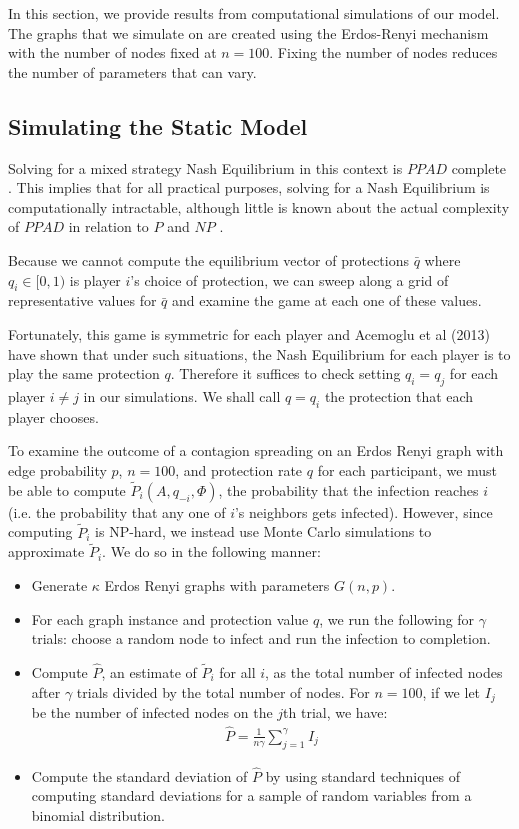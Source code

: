 \documentclass{article}
\theoremstyle{plain}
\begin{document}
In this section, we provide results from computational simulations of our model. The graphs that we simulate on are created using the Erdos-Renyi mechanism with the number of nodes fixed at $n = 100$. Fixing the number of nodes reduces the number of parameters that can vary.

\subsection{Simulating the Static Model}

Solving for a mixed strategy Nash Equilibrium in this context is $PPAD$ complete \cite{daskalakis08}. This implies that for all practical purposes, solving for a Nash Equilibrium is computationally intractable, although little is known about the actual complexity of $PPAD$ in relation to $P$ and $NP$ \cite{chen06}.

Because we cannot compute the equilibrium vector of protections $\bar{q}$ where $q_i \in [0,1)$ is player $i$'s choice of protection, we can sweep along a grid of representative values for $\bar{q}$ and examine the game at each one of these values.

Fortunately, this game is symmetric for each player and Acemoglu et al (2013) have shown that under such situations, the Nash Equilibrium for each player is to play the same protection $q$. Therefore it suffices to check setting $q_i = q_j$ for each player $i \neq j$ in our simulations. We shall call $q = q_i$ the protection that each player chooses.

To examine the outcome of a contagion spreading on an Erdos Renyi graph with edge probability $p$, $n = 100$, and protection rate $q$ for each participant, we must be able to compute $\tilde{P}_i(A, q_{-i}, \Phi)$, the probability that the infection reaches $i$ (i.e. the probability that any one of $i$'s neighbors gets infected). However, since computing $\tilde{P}_i$ is NP-hard, we instead use Monte Carlo simulations to approximate $\tilde{P}_i$. We do so in the following manner:

\begin{itemize}
  \item Generate $\kappa$ Erdos Renyi graphs with parameters $G(n, p)$.
  \item For each graph instance and protection value $q$, we run the following for $\gamma$ trials: choose a random node to infect and run the infection to completion.
  \item Compute $\hat{P}$, an estimate of $\tilde{P}_i$ for all $i$, as the total number of infected nodes after $\gamma$ trials divided by the total number of nodes. For $n = 100$, if we let $I_j$ be the number of infected nodes on the $j$th trial, we have:
    \begin{eqnarray}
      \hat{P} = \frac{1}{n \gamma} \sum_{j=1}^{\gamma} I_j
    \end{eqnarray}
  \item Compute the standard deviation of $\hat{P}$ by using standard techniques of computing standard deviations for a sample of random variables from a binomial distribution.
\end{itemize}
\end{document}
